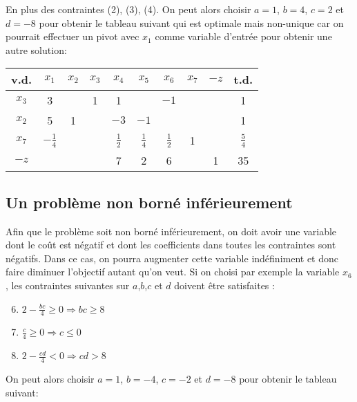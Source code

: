 En plus des contraintes (2), (3), (4). On peut alors choisir $a = 1$, $b=4$, $c=2$ et $d=-8$ pour obtenir le tableau suivant qui est optimale mais non-unique car on pourrait effectuer un pivot avec $x_1$ comme variable d’entrée pour obtenir une autre solution:
	
\begin{center}
	\renewcommand{\arraystretch}{1.5}
	\begin{tabular}{|c|cccccccc|c|}
		\hline
		v.d.  &     $x_1$      & $x_2$ & $x_3$ &     $x_4$     &     $x_5$     &     $x_6$     & $x_7$ & $-z$ &     t.d.      \\ \hline
		$x_3$ &       3        &       &   1   &       1       &               &     $-1$      &       &      &       1       \\
		$x_2$ &       5        &   1   &       &     $-3$      &     $-1$      &               &       &      &       1       \\
		$x_7$ & $-\frac{1}{4}$ &       &       & $\frac{1}{2}$ & $\frac{1}{4}$ & $\frac{1}{2}$ &   1   &      & $\frac{5}{4}$ \\ \hline
		$-z$  &                &       &       &       7       &       2       &       6       &       &  1   &      35       \\ \hline
	\end{tabular}
\end{center}

\subsection{Un problème non borné inférieurement}
Afin que le problème soit non borné inférieurement, on doit avoir une variable dont le coût est négatif et dont les coefficients dans toutes les contraintes sont négatifs. Dans ce cas, on pourra augmenter cette variable indéfiniment et donc faire diminuer l’objectif autant qu’on veut. Si on choisi par exemple la variable $x_6$, les contraintes suivantes sur $a$,$b$,$c$ et $d$ doivent être satisfaites :
\begin{enumerate}[label=(\arabic*),itemsep=1pt]
	\setcounter{enumi}{5}
	\item $2 - \frac{bc}{4} \geq 0 \Rightarrow bc \geq 8$
	\item $\frac{c}{4} \geq 0 \Rightarrow  c \leq 0$
	\item $2 - \frac{cd}{4} < 0 \Rightarrow cd > 8$
\end{enumerate}

On peut alors choisir $a = 1$, $b = -4$, $c = -2$ et $d = -8$ pour obtenir le tableau suivant:
	
